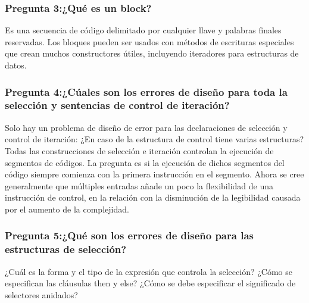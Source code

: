 \subsubsection{Pregunta 3:¿Qué es un block?}
Es una secuencia de código delimitado por cualquier llave y palabras finales reservadas. Los bloques pueden ser usados con métodos de escrituras especiales que crean muchos constructores útiles, incluyendo iteradores para estructuras de datos.
\subsubsection{Pregunta 4:¿Cúales son los errores de diseño para toda la selección y sentencias de control de iteración?}
Solo hay un problema de diseño de error para las declaraciones de selección y control de iteración:
¿En caso de la estructura de control tiene varias estructuras?
Todas las construcciones de selección e iteración controlan la ejecución de segmentos de códigos.
La pregunta es si la ejecución de dichos segmentos del código siempre comienza con la primera instrucción en el segmento. Ahora se cree generalmente que múltiples entradas añade un poco la flexibilidad de una instrucción de control, en la relación con la disminución de la legibilidad causada por el aumento de la complejidad.
\subsubsection{Pregunta 5:¿Qué son los errores de diseño para las estructuras de selección?}
¿Cuál es la forma y el tipo de la expresión que controla la selección? 
¿Cómo se especifican las cláusulas then y else? 
¿Cómo se debe especificar el significado de selectores anidados?
